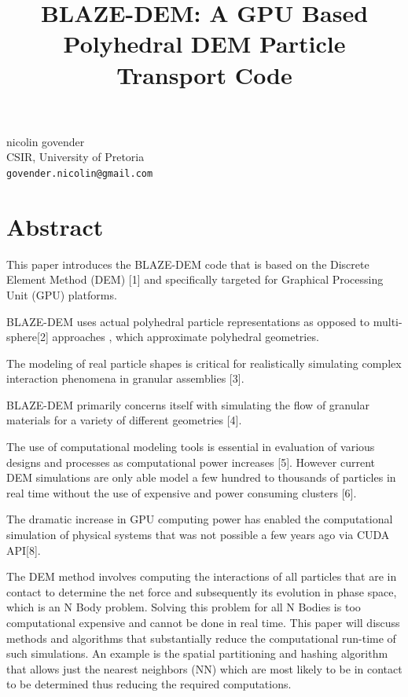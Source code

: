 \documentclass[article,A4,11pt]{llncs}%
\begin{document}
\title{BLAZE-DEM: A GPU Based Polyhedral DEM Particle Transport Code}
 \author{} \institute{}
\maketitle
\begin{center}
{\large nicolin govender}\\
CSIR, University of Pretoria\\
{\tt govender.nicolin@gmail.com}
\end{center}

\section*{Abstract}
This paper introduces the BLAZE-DEM code that is based on the Discrete Element Method (DEM) [1] and specifically targeted for Graphical Processing Unit (GPU) platforms.

BLAZE-DEM uses actual polyhedral particle representations as opposed to multi-sphere[2] approaches , which approximate polyhedral geometries. 

The modeling of real particle shapes is critical for realistically simulating complex interaction phenomena in granular assemblies [3].  

BLAZE-DEM primarily concerns itself with simulating the flow of granular materials for a variety of different geometries [4]. 

The use of computational modeling tools is essential in  evaluation of various designs and processes as computational power increases [5]. However current DEM simulations are only able model a few hundred to thousands of particles in real time without the use of expensive and power consuming clusters [6]. 

The dramatic increase in GPU computing power has enabled the computational simulation of physical systems that was not possible a few years ago via CUDA API[8].

The DEM method involves computing the interactions of all particles that are in contact to determine the net force and subsequently its evolution in phase space, which is an N Body problem. Solving this problem for all N Bodies is too computational expensive and cannot be done in real time. This paper will discuss methods and algorithms that substantially reduce the computational run-time of such simulations. An example is the spatial partitioning and hashing algorithm that allows just the nearest neighbors (NN) which are most likely to be in contact to be determined thus reducing the required computations. 
\end{document}
